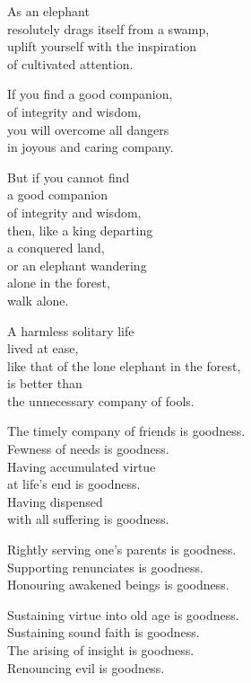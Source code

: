 As an elephant\\
resolutely drags itself from a swamp,\\
uplift yourself with the inspiration\\
of cultivated attention.

If you find a good companion,\\
of integrity and wisdom,\\
you will overcome all dangers\\
in joyous and caring company.


But if you cannot find\\
a good companion\\
of integrity and wisdom,\\
then, like a king departing\\
a conquered land,\\
or an elephant wandering\\
alone in the forest,\\
walk alone.


A harmless solitary life\\
lived at ease,\\
like that of the lone elephant in the forest,\\
is better than\\
the unnecessary company of fools.


The timely company of friends is goodness.\\
Fewness of needs is goodness.\\
Having accumulated virtue\\
at life’s end is goodness.\\
Having dispensed\\
with all suffering is goodness.


Rightly serving one's parents is goodness.\\
Supporting renunciates is goodness.\\
Honouring awakened beings is goodness.


Sustaining virtue into old age is goodness.\\
Sustaining sound faith is goodness.\\
The arising of insight is goodness.\\
Renouncing evil is goodness.

